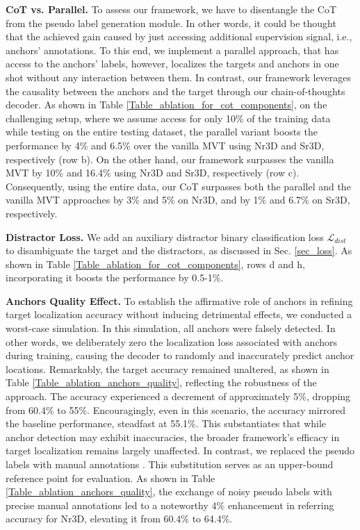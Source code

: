 \noindent \textbf{CoT vs. Parallel.}
To assess our {\papernameAbbrev} framework, we have to disentangle the CoT from the pseudo label generation module.
In other words, it could be thought that the achieved gain caused by just accessing additional supervision signal, i.e., anchors' annotations.
To this end, we implement a parallel approach, that has access to the anchors' labels, however, localizes the targets and anchors in one shot without any interaction between them.
In contrast, our {\papernameAbbrev} framework leverages the causality between the anchors and the target through our chain-of-thoughts decoder.
As shown in Table \ref{Table_ablation_for_cot_components}, on the challenging setup, where we assume access for only 10\% of the training data while testing on the entire testing dataset, the parallel variant boosts the performance by 4\% and 6.5\% over the vanilla MVT using Nr3D and Sr3D, respectively (row b).
On the other hand, our {\papernameAbbrev} framework surpasses the vanilla MVT by 10\% and 16.4\% using Nr3D and Sr3D, respectively (row c).
Consequently, using the entire data, our CoT surpasses both the parallel and the vanilla MVT approaches by 3\% and 5\% on Nr3D, and by 1\% and 6.7\% on Sr3D, respectively.

\noindent \textbf{Distractor Loss.}
We add an auxiliary distractor binary classification loss $\mathcal{L}_{dist}$ to disambiguate the target and the distractors, as discussed in Sec. \ref{sec_loss}.
As shown in Table \ref{Table_ablation_for_cot_components}, rows d and h, incorporating it boosts the performance by 0.5-1\%.

\noindent \textbf{Anchors Quality Effect.}
To establish the affirmative role of anchors in refining target localization accuracy without inducing detrimental effects, we conducted a worst-case simulation. In this simulation, all anchors were falsely detected. 
In other words, we deliberately zero the localization loss associated with anchors during training, causing the decoder to randomly and inaccurately predict anchor locations.
Remarkably, the target accuracy remained unaltered, as shown in Table \ref{Table_ablation_anchors_quality}, reflecting the robustness of the approach. 
The accuracy experienced a decrement of approximately 5\%, dropping from 60.4\% to 55\%. Encouragingly, even in this scenario, the accuracy mirrored the baseline performance, steadfast at 55.1\%. This substantiates that while anchor detection may exhibit inaccuracies, the broader framework's efficacy in target localization remains largely unaffected.
In contrast, we replaced the pseudo labels with manual annotations \citep{abdelreheem2022scanents3d}. 
This substitution serves as an upper-bound reference point for evaluation. 
As shown in Table \ref{Table_ablation_anchors_quality}, the exchange of noisy pseudo labels with precise manual annotations led to a noteworthy 4\% enhancement in referring accuracy for Nr3D, elevating it from 60.4\% to 64.4\%.

